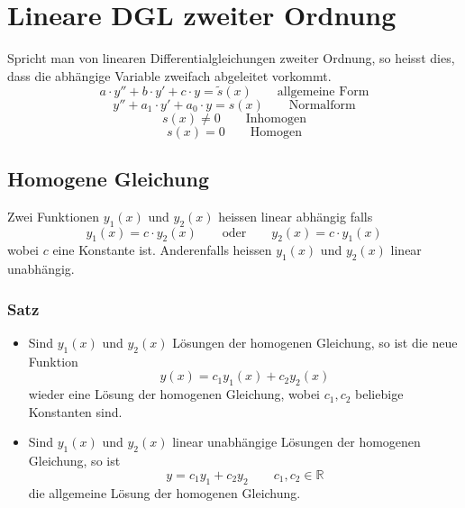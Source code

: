 \scriptsize

\normalsize

\newpage
\footnotesize

\normalsize

\newpage

\section{Lineare DGL zweiter Ordnung}
Spricht man von linearen Differentialgleichungen zweiter Ordnung, 
so heisst dies, dass die abhängige Variable zweifach abgeleitet
vorkommt.
\[ a\cdot y'' + b \cdot y' + c \cdot y = \tilde{s}(x) 
   \qquad \text{allgemeine Form}\]
\[ y'' + a_1 \cdot y' + a_0 \cdot y = s(x) 
   \qquad \text{Normalform}\]
   \[  s(x) \neq 0 \qquad \text{Inhomogen} \]
   \[  s(x) =    0 \qquad \text{Homogen} \]

\subsection{Homogene Gleichung}
Zwei Funktionen $y_1(x)$ und $y_2(x)$ heissen linear abhängig falls
\[ y_1(x)=c \cdot y_2(x) \qquad \text{oder} \qquad y_2(x)=c \cdot y_1(x) \]
wobei $c$ eine Konstante ist. Anderenfalls heissen $y_1(x)$ und $y_2(x)$
linear unabhängig.

\subsubsection{Satz}
\begin{itemize}
  \item Sind $y_1(x)$ und $y_2(x)$ Lösungen der homogenen Gleichung,
	so ist die neue Funktion 
	\[ y(x) = c_1y_1(x) + c_2y_2(x) \]
	wieder eine Lösung der homogenen Gleichung, wobei $c_1, c_2$
	beliebige Konstanten sind.
  \item Sind $y_1(x)$ und $y_2(x)$ linear unabhängige Lösungen der 
	homogenen Gleichung, so ist
	\[ y=c_1y_1 + c_2y_2 \qquad c_1, c_2 \in \mathbb{R} \]
	die allgemeine Lösung der homogenen Gleichung.
\end{itemize}

